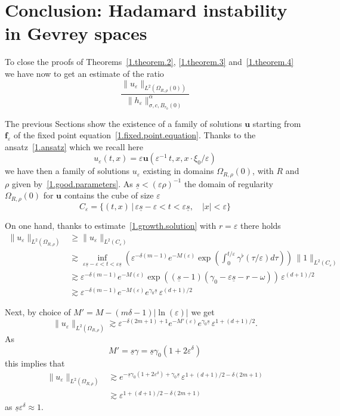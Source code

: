 \documentclass[10pt]{amsart}
\theoremstyle{definition}
\theoremstyle{plain}
\newcommand*\e{\varepsilon}
\newcommand{\alf}{\alpha}%
\newcommand*\g{\gamma}
\newcommand{\ubf}{{\mathbf u}}
\newcommand*\f{{\mathbf f}}
\newcommand*\dsp{\displaystyle}
\newcommand*\und{\underline}
\begin{document}
\section{Conclusion: Hadamard instability in Gevrey spaces}\label{1.section.Hadamard}

To close the proofs of Theorems~\ref{1.theorem.2}, \ref{1.theorem.3} and~\ref{1.theorem.4} we have now to get an estimate of the ratio
\[
\frac{\dsp \|u_{\e}\|_{L^2(\Omega_{R,\rho}(0))}}{\dsp \|h_{\e}\|^{\alf}_{\sigma,c,B_{r_0}(0)}}
\]


The previous Sections show the existence of a family of solutions $\ubf$ starting from $\f_{\e}$ of the fixed point equation~\eqref{1.fixed.point.equation}. Thanks to the ansatz~\eqref{1.ansatz} which we recall here
\[
u_{\e}(t,x) = \e\ubf(\e^{-1}\,t,x,x\cdot\xi_0/\e)
\]
we have then a family of solutions $u_{\e}$ existing in domains $\Omega_{R,\rho}(0)$, with $R$ and $\rho$ given by~\eqref{1.good.parameters}. As $\und{s} < (\e\rho)^{-1}$ the domain of regularity $\Omega_{R,\rho}(0)$ for $\ubf$ contains the cube of size $\e$
\[
C_{\e} = \{ (t,x) \,|\, \e\und{s} - \e < t <\e\und{s},\quad |x| < \e \}
\]


On one hand, thanks to estimate~\eqref{1.growth.solution} with $r=\e$ there holds
\begin{align*}
\|u_{\e}\|_{L^2(\Omega_{R,\rho})} & \geq \|u_{\e}\|_{L^2(C_{\e})} \\
& \gtrsim \inf_{\e\und{s} - \e < t <\e\und{s}} \left(\e^{-\delta(m-1)} e^{-M(\e)} \exp \left(\int_{0}^{t/\e} \g^{\flat}(\tau/\e) d\tau \right) \right) \,\|1\|_{L^2(C_{\e})} \\
& \gtrsim \e^{-\delta(m-1)} e^{-M(\e)} \exp \left((\und{s}-1) \left(\g_0 - \e\und{s} - r - \omega \right) \right) \, \e^{(d+1)/2} \\
& \gtrsim \e^{-\delta(m-1)} e^{-M(\e)} e^{\g_0\und{s}}\, \e^{(d+1)/2}
\end{align*}


 Next, by choice of $M' = M -(m\delta-1)|\ln(\e)|$ we get
\[
\|u_{\e}\|_{L^2(\Omega_{R,\rho})} \gtrsim \e^{-\delta(2m+1)+1} e^{-M'(\e)} e^{\g_0\und{s}} \, \e^{1+(d+1)/2}.
\]
As
\[
M' = \und{s} \g = \und{s}\g_0 (1+ 2\e^{\delta})
\]
this implies that
\begin{align*}
\|u_{\e}\|_{L^2(\Omega_{R,\rho})} & \gtrsim e^{ - \und{s}\g_0(1 + 2\e^{\delta}) + \g_0 \und{s}} \, \e^{1+(d+1)/2-\delta(2m+1)} \\
& \gtrsim \e^{1+(d+1)/2-\delta(2m+1)}
\end{align*}
as $\und{s}\e^{\delta} \approx 1$.
\end{document}
